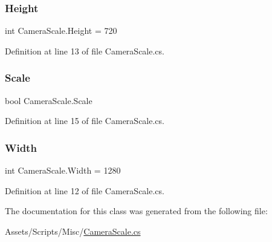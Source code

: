 \subsubsection{\texorpdfstring{Height}{Height}}
{\footnotesize\ttfamily int Camera\+Scale.\+Height = 720}



Definition at line 13 of file Camera\+Scale.\+cs.

\mbox{\label{class_camera_scale_ae681f399c01532bc1509c03996794a79}} 
\subsubsection{\texorpdfstring{Scale}{Scale}}
{\footnotesize\ttfamily bool Camera\+Scale.\+Scale}



Definition at line 15 of file Camera\+Scale.\+cs.

\mbox{\label{class_camera_scale_a1be66b77eebaac3edf0a60a36f9c11bb}} 
\subsubsection{\texorpdfstring{Width}{Width}}
{\footnotesize\ttfamily int Camera\+Scale.\+Width = 1280}



Definition at line 12 of file Camera\+Scale.\+cs.



The documentation for this class was generated from the following file\+:\begin{DoxyCompactItemize}
\item 
Assets/\+Scripts/\+Misc/\mbox{\hyperlink{_camera_scale_8cs}{Camera\+Scale.\+cs}}\end{DoxyCompactItemize}
